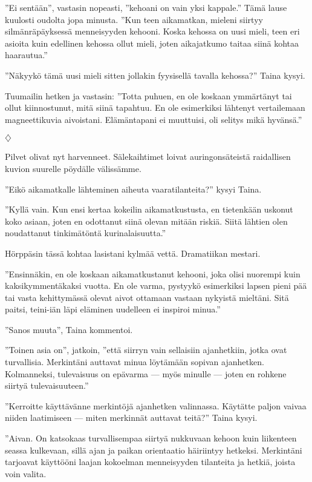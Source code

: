 ﻿\documentclass[a4paper, 12pt, finnish]{article}
\newcommand{\q}[1]{''#1''}
\newcommand{\openq}[1]{''#1} %
\def\jump{\vspace{2mm} \centerline{$\diamondsuit$} \vspace{2mm}}
\begin{document}
\q{Ei sentään}, vastasin nopeasti, \q{kehoani on vain yksi kappale.}
Tämä lause kuulosti oudolta jopa minusta.
\q{Kun teen aikamatkan,
mieleni siirtyy silmänräpäyksessä menneisyyden kehooni. Koska kehossa on
uusi mieli, teen eri asioita kuin edellinen kehossa ollut mieli,
joten aikajatkumo taitaa siinä kohtaa haarautua.}

\q{Näkyykö tämä uusi mieli sitten jollakin fyysisellä tavalla kehossa?} Taina kysyi.

Tuumailin hetken ja vastasin: \q{Totta puhuen, en ole koskaan ymmärtänyt
tai ollut kiinnostunut, mitä siinä tapahtuu. En ole esimerkiksi
lähtenyt vertailemaan magneettikuvia aivoistani. Elämäntapani ei
muuttuisi, oli selitys mikä hyvänsä.}


\jump


Pilvet olivat nyt harvenneet. Sälekaihtimet loivat auringonsäteistä
raidallisen kuvion suurelle pöydälle välissämme.

\q{Eikö aikamatkalle lähteminen aiheuta vaaratilanteita?} kysyi Taina.

\q{Kyllä vain. Kun ensi kertaa kokeilin aikamatkustusta, en tietenkään uskonut
koko asiaan, joten en odottanut siinä olevan mitään riskiä. Siitä lähtien
olen noudattanut tinkimätöntä kurinalaisuutta.}

Hörppäsin tässä kohtaa lasistani kylmää vettä. Dramatiikan mestari.

\q{Ensinnäkin, en ole koskaan
aikamatkustanut kehooni, joka olisi nuorempi kuin kaksikymmentäkaksi vuotta.
En ole varma, pystyykö esimerkiksi lapsen pieni pää tai
vasta kehittymässä olevat aivot ottamaan vastaan nykyistä mieltäni.
Sitä paitsi, teini-iän läpi eläminen uudelleen ei inspiroi minua.}

\q{Sanos muuta}, Taina kommentoi.

\q{Toinen asia on}, jatkoin, \q{että siirryn vain sellaisiin
ajanhetkiin, jotka ovat turvallisia. Merkintäni auttavat minua
löytämään sopivan ajanhetken. Kolmanneksi, tulevaisuus on
epävarma --- myös minulle --- joten
en rohkene siirtyä tulevaisuuteen.} 

\q{Kerroitte käyttävänne merkintöjä ajanhetken valinnassa.
Käytätte paljon vaivaa niiden laatimiseen --- miten merkinnät
auttavat teitä?} Taina kysyi.

\openq{Aivan. On katsokaas turvallisempaa siirtyä nukkuvaan kehoon
kuin liikenteen seassa kulkevaan,
sillä ajan ja paikan orientaatio häiriintyy hetkeksi.
Merkintäni tarjoavat käyttööni laajan kokoelman
menneisyyden tilanteita ja hetkiä, joista voin valita.}
\end{document}
